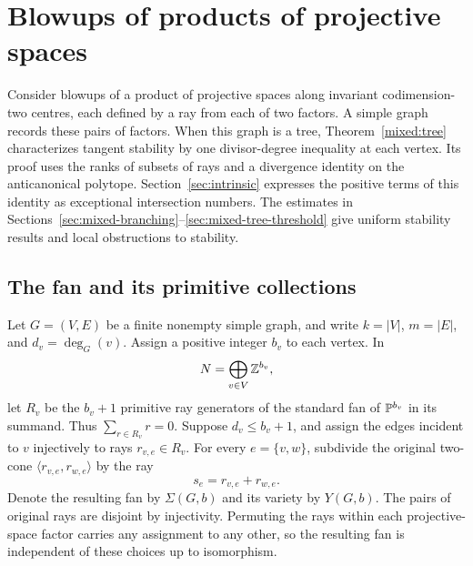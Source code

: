 \section{Blowups of products of projective spaces}\label{sec:mixed}

Consider blowups of a product of projective spaces along invariant
codimension-two centres, each defined by a ray from each of two factors.
A simple graph records these pairs of factors. When this graph is a tree,
Theorem~\ref{mixed:tree} characterizes tangent stability by one
divisor-degree inequality at each vertex. Its proof uses the ranks of
subsets of rays and a divergence identity on the anticanonical polytope.
Section~\ref{sec:intrinsic} expresses the positive terms of this identity as
exceptional intersection numbers. The estimates in
Sections~\ref{sec:mixed-branching}--\ref{sec:mixed-tree-threshold} give
uniform stability results and local obstructions to stability.

\subsection{The fan and its primitive collections}

Let $G=(V,E)$ be a finite nonempty simple graph, and write
$k=|V|$, $m=|E|$, and $d_v=\deg_G(v)$. Assign a positive integer $b_v$
to each vertex. In
\[
 N=\bigoplus_{v\in V}\mathbb{Z}^{b_v},
\]
let $R_v$ be the $b_v+1$ primitive ray generators of the standard fan of
$\mathbb{P}^{b_v}$ in its summand. Thus $\sum_{r\in R_v}r=0$. Suppose
$d_v\le b_v+1$, and assign the edges incident to $v$ injectively to rays
$r_{v,e}\in R_v$. For every $e=\{v,w\}$, subdivide the original two-cone
$\langle r_{v,e},r_{w,e}\rangle$ by the ray
\begin{equation}\label{mixed:exceptional-ray}
 s_e=r_{v,e}+r_{w,e}.
\end{equation}
Denote the resulting fan by $\Sigma(G,b)$ and its variety by $Y(G,b)$.
The pairs of original rays are disjoint by injectivity. Permuting the
rays within each projective-space factor carries any assignment to any
other, so the resulting fan is independent of these choices up to
isomorphism.

